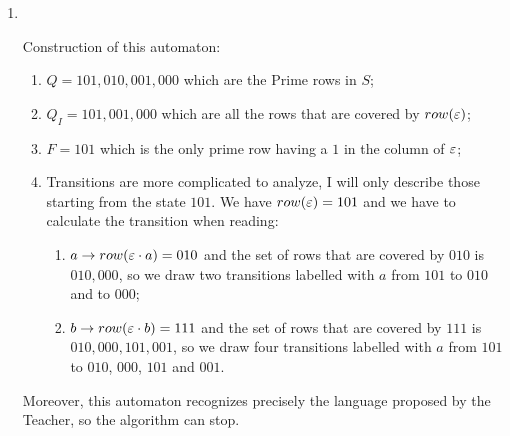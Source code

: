 \begin{enumerate}
  \item \begin{minipage}{0.3\textwidth}
          
        \end{minipage}\quad\\
        \begin{minipage}{1\textwidth}
          Construction of this automaton:
          \begin{enumerate}
            \item $Q = {101,010,001,000}$ which are the Prime rows in $S$;
            \item $Q_I = {101,001,000}$ which are all the rows that are covered by $row(\varepsilon)$;
            \item $F = {101}$ which is the only prime row having a $1$ in the column of $\varepsilon$;
            \item Transitions are more complicated to analyze, I will only describe those starting from the state $101$. We have $row(\varepsilon) = 101$ and we have to calculate the transition when reading:
                  \begin{enumerate}
                    \item $a \rightarrow row(\varepsilon \cdot a) = 010$ and the set of rows that are covered by $010$ is ${010, 000}$, so we draw two transitions labelled with $a$ from $101$ to $010$ and to $000$;
                    \item $b \rightarrow row(\varepsilon \cdot b) = 111$ and the set of rows that are covered by $111$ is ${010, 000, 101, 001}$, so we draw four transitions labelled with $a$ from $101$ to $010$, $000$, $101$ and $001$.
                  \end{enumerate}
          \end{enumerate}
          Moreover, this automaton recognizes precisely the language proposed by the Teacher, so the algorithm can stop.
        \end{minipage}
\end{enumerate}